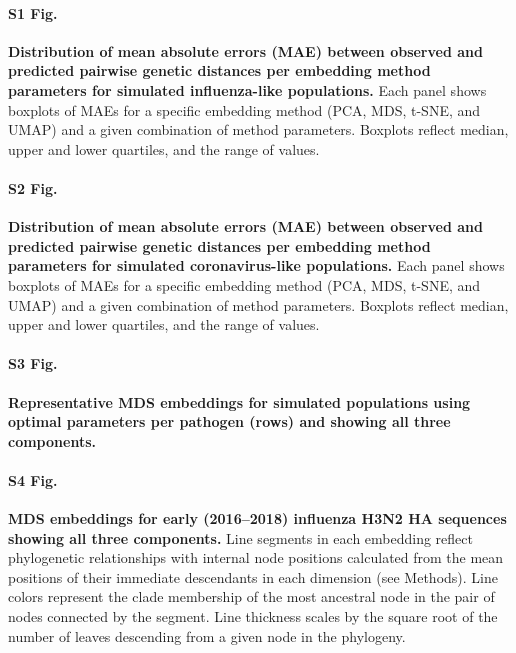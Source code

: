 \documentclass[10pt,letterpaper]{article}
\begin{document}
\paragraph*{S1 Fig.}
\label{S_Fig_simulated_flu_errors}
{\bf Distribution of mean absolute errors (MAE) between observed and predicted pairwise genetic distances per embedding method parameters for simulated influenza-like populations.}
Each panel shows boxplots of MAEs for a specific embedding method (PCA, MDS, t-SNE, and UMAP) and a given combination of method parameters.
Boxplots reflect median, upper and lower quartiles, and the range of values.

\paragraph*{S2 Fig.}
\label{S_Fig_simulated_coronavirus_errors}
{\bf Distribution of mean absolute errors (MAE) between observed and predicted pairwise genetic distances per embedding method parameters for simulated coronavirus-like populations.}
Each panel shows boxplots of MAEs for a specific embedding method (PCA, MDS, t-SNE, and UMAP) and a given combination of method parameters.
Boxplots reflect median, upper and lower quartiles, and the range of values.

\paragraph*{S3 Fig.}
\label{S_Fig_simulated_representative_mds_embeddings}
{\bf Representative MDS embeddings for simulated populations using optimal parameters per pathogen (rows) and showing all three components.}

\paragraph*{S4 Fig.}
\label{S_Fig_early_flu_mds_embeddings}
{\bf MDS embeddings for early (2016--2018) influenza H3N2 HA sequences showing all three components.}
Line segments in each embedding reflect phylogenetic relationships with internal node positions calculated from the mean positions of their immediate descendants in each dimension (see Methods).
Line colors represent the clade membership of the most ancestral node in the pair of nodes connected by the segment.
Line thickness scales by the square root of the number of leaves descending from a given node in the phylogeny.
\end{document}
